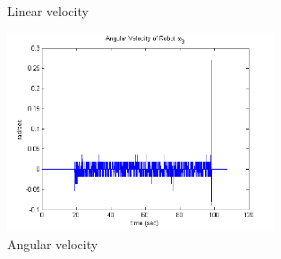 \begin{figure}
\begin{minipage}[t]{0.5\textwidth}
		\caption{Linear velocity}\label{fig:linVel}
	\end{minipage}
	\hfill
	\begin{minipage}[t]{0.5\textwidth}
		\centering
		\includegraphics[width=3.1in]{Chapter5/fig/linOmega} 
		\caption{Angular velocity}\label{fig:linOmega}
	\end{minipage}
\end{figure}

